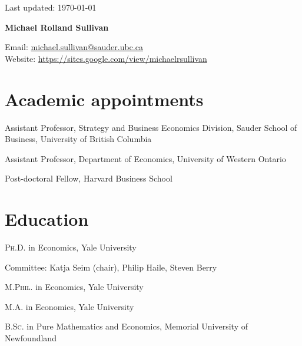 \documentclass[11pt]{article} %
\begin{document}
 \begin{flushright}
   \scriptsize
	Last updated: \today
   \normalsize
\end{flushright}
{\LARGE\bfseries Michael Rolland Sullivan} %
\bigskip\bigskip\medskip %

\medskip %

Email: \href{mailto:michael.sullivan@sauder.ubc.ca}{michael.sullivan@sauder.ubc.ca}\\ 
Website: \href{https://sites.google.com/view/michaelrsullivan/home}{https://sites.google.com/view/michaelrsullivan}\\ 

%

\section*{Academic appointments}

 Assistant Professor, Strategy and Business Economics Division, Sauder School of Business, 
	University of British Columbia

 Assistant Professor, Department of Economics, University of Western Ontario

 Post-doctoral Fellow, Harvard Business School


\section*{Education}

\textsc{Ph.D.} in Economics, Yale University  

\hspace{1cm} \small Committee: Katja Seim (chair), Philip Haile, Steven Berry \normalsize

\textsc{M.Phil.} in Economics, Yale University 

\textsc{M.A.} in Economics, Yale University 

\textsc{B.Sc.} in Pure Mathematics and Economics, Memorial University of Newfoundland
\end{document}
